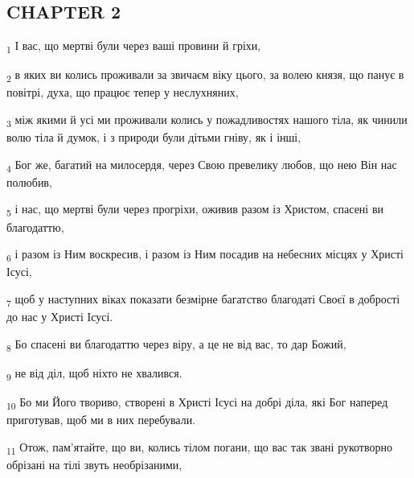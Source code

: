 \subsection{CHAPTER 2}
\begin{tcolorbox}
\textsubscript{1} І вас, що мертві були через ваші провини й гріхи,
\end{tcolorbox}
\begin{tcolorbox}
\textsubscript{2} в яких ви колись проживали за звичаєм віку цього, за волею князя, що панує в повітрі, духа, що працює тепер у неслухняних,
\end{tcolorbox}
\begin{tcolorbox}
\textsubscript{3} між якими й усі ми проживали колись у пожадливостях нашого тіла, як чинили волю тіла й думок, і з природи були дітьми гніву, як і інші,
\end{tcolorbox}
\begin{tcolorbox}
\textsubscript{4} Бог же, багатий на милосердя, через Свою превелику любов, що нею Він нас полюбив,
\end{tcolorbox}
\begin{tcolorbox}
\textsubscript{5} і нас, що мертві були через прогріхи, оживив разом із Христом, спасені ви благодаттю,
\end{tcolorbox}
\begin{tcolorbox}
\textsubscript{6} і разом із Ним воскресив, і разом із Ним посадив на небесних місцях у Христі Ісусі,
\end{tcolorbox}
\begin{tcolorbox}
\textsubscript{7} щоб у наступних віках показати безмірне багатство благодаті Своєї в добрості до нас у Христі Ісусі.
\end{tcolorbox}
\begin{tcolorbox}
\textsubscript{8} Бо спасені ви благодаттю через віру, а це не від вас, то дар Божий,
\end{tcolorbox}
\begin{tcolorbox}
\textsubscript{9} не від діл, щоб ніхто не хвалився.
\end{tcolorbox}
\begin{tcolorbox}
\textsubscript{10} Бо ми Його твориво, створені в Христі Ісусі на добрі діла, які Бог наперед приготував, щоб ми в них перебували.
\end{tcolorbox}
\begin{tcolorbox}
\textsubscript{11} Отож, пам'ятайте, що ви, колись тілом погани, що вас так звані рукотворно обрізані на тілі звуть необрізаними,
\end{tcolorbox}
